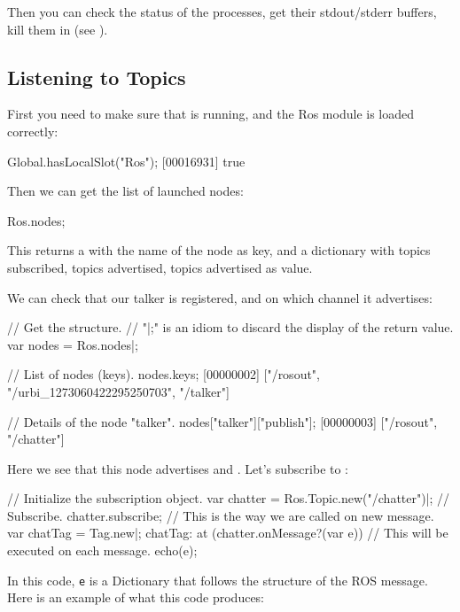 Then you can check the status of the processes, get their stdout/stderr
buffers, kill them in \us (see ).


\subsection{Listening to Topics}

First you need to make sure that  is running, and the Ros
module is loaded correctly:

\begin{urbiunchecked}
Global.hasLocalSlot("Ros");
[00016931] true
\end{urbiunchecked}

\noindent
Then we can get the list of launched nodes:

\begin{urbiunchecked}
Ros.nodes;
\end{urbiunchecked}

This returns a  with the name of the node as key, and
a dictionary with topics subscribed, topics advertised, topics advertised as
value.

We can check that our talker is registered, and on which channel it
advertises:

\begin{urbiunchecked}
// Get the structure.
// "|;" is an idiom to discard the display of the return value.
var nodes = Ros.nodes|;

// List of nodes (keys).
nodes.keys;
[00000002] ["/rosout", "/urbi_1273060422295250703", "/talker"]

// Details of the node "talker".
nodes["talker"]["publish"];
[00000003] ["/rosout", "/chatter"]
\end{urbiunchecked}

Here we see that this node advertises  and
. Let's subscribe to :

\begin{urbiunchecked}
// Initialize the subscription object.
var chatter = Ros.Topic.new("/chatter")|;
// Subscribe.
chatter.subscribe;
// This is the way we are called on new message.
var chatTag = Tag.new|;
chatTag: at (chatter.onMessage?(var e))
  // This will be executed on each message.
  echo(e);
\end{urbiunchecked}

In this code, \lstinline{e} is a Dictionary that follows the structure of
the ROS message. Here is an example of what this code produces:

